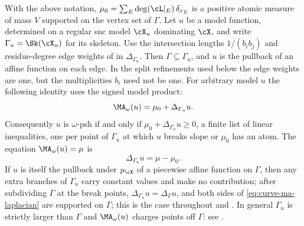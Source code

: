 \begin{lemma}
\label{lem:ch31-curve-ma-affine}
With the above notation, $\mu_0=\sum_E\deg(\cL|_E)\,\delta_{x_E}$ is a
positive atomic measure of mass $V$ supported on the vertex set of
$\Gamma$.  Let $u$ be a model function, determined on a regular snc model $\cX_u$ dominating $\cX$, and write
$\Gamma_u=\Sk(\cX_u)$ for its skeleton.  Use the intersection lengths
$1/(b_i b_j)$ and residue-degree edge weights of
 in $\Delta_{\Gamma_u}$.
Then $\Gamma\subseteq\Gamma_u$, and $u$ is the pullback of an affine
function on each edge.  In the split refinements used below the edge
weights are one, but the multiplicities $b_i$ need not be one.  For
arbitrary model $u$ the following identity uses the signed model product:
\begin{equation}
                         \MA_\omega(u)=\mu_0+\Delta_{\Gamma_u}u .
\label{eq:curve-ma-laplacian}
\end{equation}
Consequently $u$ is $\omega$-psh if and only if
$\mu_0+\Delta_{\Gamma_u}u\geq0$, a finite list of linear inequalities, one
per point of $\Gamma_u$ at which $u$ breaks slope or $\mu_0$ has an
atom.  The equation $\MA_\omega(u)=\mu$ is
\begin{equation}
                         \Delta_{\Gamma_u}u=\mu-\mu_0 .
\label{eq:curve-poisson}
\end{equation}
If $u$ is itself the pullback under $p_{\cX}$ of a piecewise affine
function on $\Gamma$, then any extra branches of $\Gamma_u$ carry constant values and make
no contribution; after subdividing $\Gamma$ at the break points,
$\Delta_{\Gamma_u}u=\Delta_\Gamma u$, and both sides of
\eqref{eq:curve-ma-laplacian} are supported on $\Gamma$; this is the case
throughout  and
.  In general $\Gamma_u$ is strictly larger
than $\Gamma$ and $\MA_\omega(u)$ charges points off $\Gamma$:
see .
\end{lemma}

